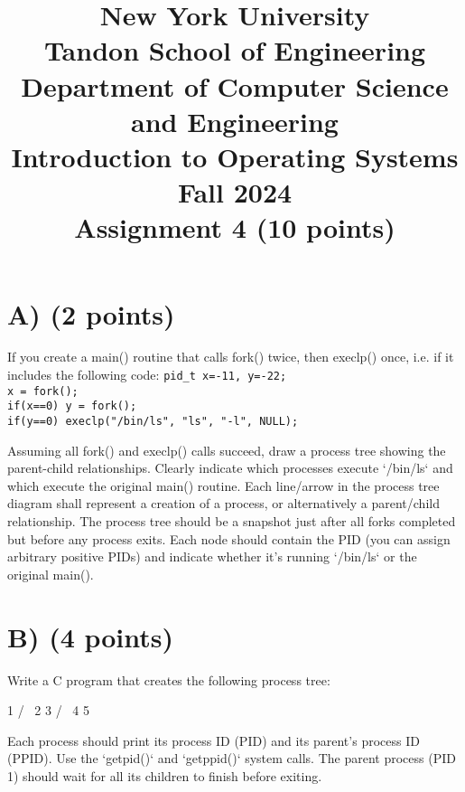 \documentclass{article}
\begin{document}
\title{New York University \\ Tandon School of Engineering \\ Department of Computer Science and Engineering \\ Introduction to Operating Systems \\ Fall 2024 \\ Assignment 4 (10 points)}
\date{}
\maketitle

\section*{A) (2 points)}
If you create a main() routine that calls fork() twice, then execlp() once, i.e. if it includes the following code:
\texttt{pid\_t x=-11, y=-22; \\
x = fork(); \\
if(x==0) y = fork(); \\
if(y==0) execlp("/bin/ls", "ls", "-l", NULL);}

Assuming all fork() and execlp() calls succeed, draw a process tree showing the parent-child relationships. Clearly indicate which processes execute  `/bin/ls` and which execute the original main() routine.  Each line/arrow in the process tree diagram shall represent a creation of a process, or alternatively a parent/child relationship.  The process tree should be a snapshot just after all forks completed but before any process exits.  Each node should contain the PID (you can assign arbitrary positive PIDs) and indicate whether it's running `/bin/ls` or the original main().



\section*{B) (4 points)}
Write a C program that creates the following process tree:

       1
      / \
     2   3
    / \
   4   5

Each process should print its process ID (PID) and its parent's process ID (PPID).  Use the `getpid()` and `getppid()` system calls.  The parent process (PID 1) should wait for all its children to finish before exiting.


\end{document}
